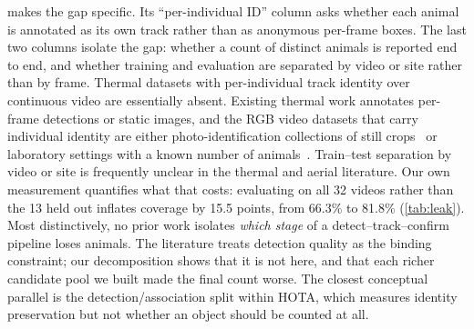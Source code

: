  makes the gap specific. Its ``per-individual ID'' column asks whether
each animal is annotated as its own track rather than as anonymous per-frame boxes. The last
two columns isolate the gap: whether a count of distinct animals is reported end to end, and
whether training and evaluation are separated by video or site rather than by frame. Thermal
datasets with per-individual track identity over continuous video are essentially absent.
Existing thermal work annotates per-frame detections or static images, and the RGB video
datasets that carry individual identity are either photo-identification collections of
still crops~\cite{adam2025wildlifereid10k} or laboratory settings with a known number of
animals~\cite{dolokov2023upper}. Train--test
separation by video or site is frequently unclear in the thermal and aerial literature. Our
own measurement quantifies what that costs: evaluating on all 32 videos rather than the 13
held out inflates coverage by 15.5 points, from 66.3\% to 81.8\% (\cref{tab:leak}). Most
distinctively, no prior work isolates \emph{which stage} of a detect--track--confirm
pipeline loses animals. The literature treats detection quality as the binding constraint;
our decomposition shows that it is not here, and that each richer candidate pool we built
made the final count worse. The closest conceptual parallel is the detection/association
split within HOTA, which measures identity preservation but not whether an object should be
counted at all.
